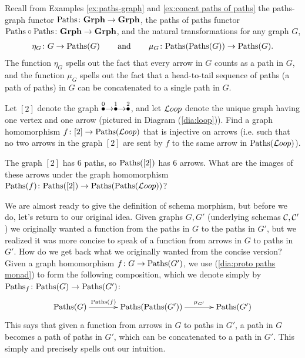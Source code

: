 Recall from Examples \ref{ex:paths-graph} and \ref{ex:concat paths of paths} the paths-graph functor $\textnormal{Paths}\colon{\bf Grph}\rightarrow{\bf Grph}$, the paths of paths functor $\textnormal{Paths}\circ\textnormal{Paths}\colon{\bf Grph}\rightarrow{\bf Grph}$, and the natural transformations for any graph $G$, 
\begin{align}\label{dia:proto paths monad}
\eta_G\colon G\rightarrow\textnormal{Paths}(G)\hspace{.3in}\textnormal{and}\hspace{.3in}\mu_G\colon\textnormal{Paths}(\textnormal{Paths}(G))\rightarrow\textnormal{Paths}(G).
\end{align}
The function $\eta_G$ spells out the fact that every arrow in $G$ counts as a path in $G$, and the function $\mu_G$ spells out the fact that a head-to-tail sequence of paths (a path of paths) in $G$ can be concatenated to a single path in $G$.

\begin{exercise}
Let $[2]$ denote the graph $\stackrel{0}{\bullet}\rightarrow\stackrel{1}{\bullet}\rightarrow\stackrel{2}{\bullet}$, and let ${\mathcal{L} oop}$ denote the unique graph having one vertex and one arrow (pictured in Diagram (\ref{dia:loop})).
\sexc Find a graph homomorphism $f\colon[2]\rightarrow\textnormal{Paths}({\mathcal{L} oop})$ that is injective on arrows (i.e. such that no two arrows in the graph $[2]$ are sent by $f$ to the same arrow in $\textnormal{Paths}({\mathcal{L} oop})$).
\item The graph $[2]$ has 6 paths, so $\textnormal{Paths}([2])$ has 6 arrows. What are the images of these arrows under the graph homomorphism $\textnormal{Paths}(f)\colon\textnormal{Paths}([2])\rightarrow\textnormal{Paths}(\textnormal{Paths}({\mathcal{L} oop}))$? 
\endsexc
\end{exercise}

We are almost ready to give the definition of schema morphism, but before we do, let's return to our original idea. Given graphs $G,G'$ (underlying schemas $\mathcal{C},\mathcal{C}'$) we originally wanted a function from the paths in $G$ to the paths in $G'$, but we realized it was more concise to speak of a function from arrows in $G$ to paths in $G'$. How do we get back what we originally wanted from the concise version? Given a graph homomorphism $f\colon G\rightarrow\textnormal{Paths}(G')$, we use (\ref{dia:proto paths monad}) to form the following composition, which we denote simply by $\textnormal{Paths}_f\colon\textnormal{Paths}(G)\rightarrow\textnormal{Paths}(G')$:
\begin{align}\label{dia:kleisli comp in graph}
\xymatrix@=35pt{\Paths(G)\ar[r]^-{\Paths(f)}&\Paths(\Paths(G'))\ar[r]^-{\mu_{G'}}&\Paths(G')}
\end{align}
This says that given a function from arrows in $G$ to paths in $G'$, a path in $G$ becomes a path of paths in $G'$, which can be concatenated to a path in $G'$. This simply and precisely spells out our intuition.

